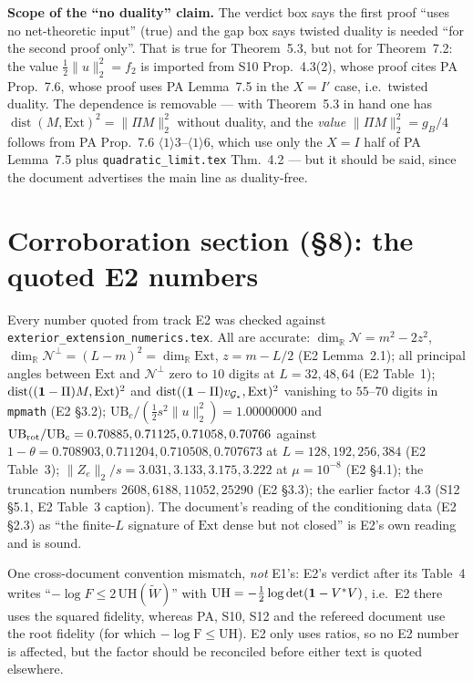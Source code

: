 \documentclass[11pt]{article}
\newcommand{\Wt}{\widetilde W}\newcommand{\Om}{\Omega}\newcommand{\Gm}{\Gamma}
\newcommand{\norm}[1]{\lVert #1\rVert}\newcommand{\abs}[1]{\lvert #1\rvert}
\newcommand{\Ext}{\mathrm{Ext}}\newcommand{\Nvis}{\mathcal N}
\DeclareMathOperator{\dist}{dist}\DeclareMathOperator{\ran}{ran}
\begin{document}
\begin{verdictgap}
\textbf{Scope of the ``no duality'' claim.}  The verdict box says the first proof ``uses no
net-theoretic input'' (true) and the gap box says twisted duality is needed ``for the second
proof only''.  That is true for Theorem~5.3, but not for Theorem~7.2: the value
$\tfrac12\norm u_2^2=f_2$ is imported from S10 Prop.~4.3(2), whose proof cites PA Prop.~7.6,
whose proof uses PA Lemma~7.5 in the $X=I'$ case, i.e.\ twisted duality.  The dependence is
removable --- with Theorem~5.3 in hand one has $\dist(M,\Ext)^2=\norm{\Pi M}_2^2$ without
duality, and the \emph{value} $\norm{\Pi M}_2^2=g_B/4$ follows from PA
Prop.~7.6 $\langle1\rangle3$--$\langle1\rangle6$, which use only the $X=I$ half of PA
Lemma~7.5 plus \texttt{quadratic\_limit.tex} Thm.~4.2 --- but it should be said, since the
document advertises the main line as duality-free.
\end{verdictgap}

\section{Corroboration section (\S8): the quoted E2 numbers}\label{sec:E2check}

Every number quoted from track E2 was checked against
\texttt{exterior\_extension\_numerics.tex}.  All are accurate:
$\dim_{\mathbb R}\Nvis=m^2-2z^2$, $\dim_{\mathbb R}\Nvis^{\perp}=(L-m)^2=\dim_{\mathbb R}\Ext$,
$z=m-L/2$ (E2 Lemma~2.1); all principal angles between $\Ext$ and $\Nvis^{\perp}$ zero to
$10$ digits at $L=32,48,64$ (E2 Table~1); $\dist((\one-\Pi)M,\Ext)^2$ and
$\dist((\one-\Pi)v_{\Gs_*},\Ext)^2$ vanishing to $55$--$70$ digits in \texttt{mpmath}
(E2 \S3.2); $\mathrm{UB}_c/(\tfrac12s^2\norm u_2^2)=1.00000000$ and
$\mathrm{UB}_{\rm rot}/\mathrm{UB}_c=0.70885,0.71125,0.71058,0.70766$ against
$1-\theta=0.708903,0.711204,0.710508,0.707673$ at $L=128,192,256,384$ (E2 Table~3);
$\norm{Z_e}_2/s=3.031,3.133,3.175,3.222$ at $\mu=10^{-8}$ (E2 \S4.1); the truncation numbers
$2608,6188,11052,25290$ (E2 \S3.3); the earlier factor $4.3$ (S12 \S5.1, E2 Table~3 caption).
The document's reading of the conditioning data (E2 \S2.3) as ``the finite-$L$ signature of
$\Ext$ dense but not closed'' is E2's own reading and is sound.

One cross-document convention mismatch, \emph{not} E1's: E2's verdict after its Table~4
writes ``$-\log F\le2\,\mathrm{UH}(\Wt)$'' with $\mathrm{UH}=-\tfrac12\log\det(\mathbf 1-V^*V)$,
i.e.\ E2 there uses the squared fidelity, whereas PA, S10, S12 and the refereed document use
the root fidelity (for which $-\log\mathrm F\le\mathrm{UH}$).  E2 only uses ratios, so no E2
number is affected, but the factor should be reconciled before either text is quoted
elsewhere.
\end{document}
